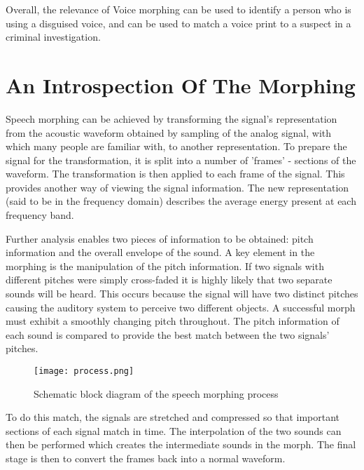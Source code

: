 \documentclass[12pt]{report}
\begin{document}
Overall, the relevance of Voice morphing can be used to identify a person who is using a disguised voice, and can be used 
to match a voice print to a suspect in a criminal investigation.

\section{An Introspection Of The Morphing}
Speech morphing can be achieved by transforming the signal’s representation from the acoustic waveform obtained by sampling of the analog signal, with which many people are familiar with, to another representation. To prepare the signal for the transformation, it is split into a number of 'frames' - sections of the waveform. The transformation is then applied to each frame of the signal. This provides another way of viewing the signal information. The new representation (said to be in the frequency domain) describes the average energy present at each frequency band. 
\newline

Further analysis enables two pieces of information to be obtained: pitch information and the overall envelope of the sound. A key element in the morphing is the manipulation of the pitch information. If two signals with different pitches were simply cross-faded it is highly likely that two separate sounds will be heard. This occurs because the signal will have two distinct pitches causing the auditory system to perceive two different objects. A successful morph must exhibit a smoothly changing pitch throughout. The pitch information of each sound is compared to provide the best match between the two signals' pitches. 
\newline
\begin{figure}[h!]
\begin{center}
  \texttt{[image: process.png]}
  \caption{Schematic block diagram of the speech morphing process}
  \label{fig:is}
\end{center}
\end{figure}

To do this match, the signals are stretched and compressed so that important sections of each signal match in time. The interpolation of the two sounds can then be performed which creates the intermediate sounds in the morph. The final stage is then to convert the frames back into a normal waveform.



\end{document}

